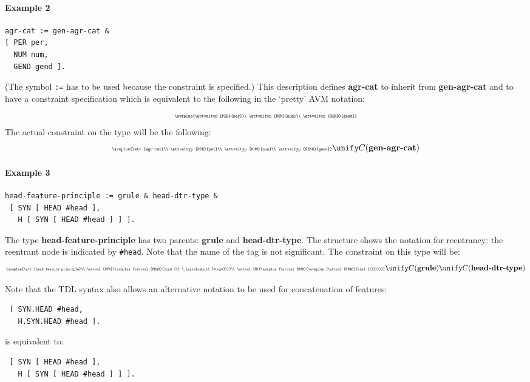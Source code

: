 \documentclass[12pt]{report}
\begin{document}
\paragraph{Example 2}

\begin{verbatim}
agr-cat := gen-agr-cat &
[ PER per,
  NUM num,
  GEND gend ].
\end{verbatim}
(The symbol \verb+:=+ has to be used because the
constraint is specified.)
This description
defines {\bf agr-cat} to inherit from {\bf gen-agr-cat} and to
have a constraint specification which is equivalent to the
following in the `pretty' AVM notation:
\[
\mbox{\tiny
   $\avmplus{\attvaltyp{PER}{per}\\
             \attvaltyp{NUM}{num}\\
             \attvaltyp{GEND}{gend}}$}
\]
The actual constraint on the type will be the following:
\[
\mbox{\tiny
   $\avmplus{\att{agr-cat}\\
             \attvaltyp{PER}{per}\\
             \attvaltyp{NUM}{num}\\
             \attvaltyp{GEND}{gend}}$} \unify
C(\mbox{\bf gen-agr-cat})
\]


\paragraph{Example 3}

\begin{verbatim}
head-feature-principle := grule & head-dtr-type & 
 [ SYN [ HEAD #head ],
   H [ SYN [ HEAD #head ] ] ].
\end{verbatim}
The type {\bf head-feature-principle}
has two parents: {\bf grule} and {\bf head-dtr-type}. 
The structure shows the notation for reentrancy: the
reentrant node is indicated by \verb+#head+.  Note that
the name of the tag is not significant.  
The constraint on this type will be:
\[
\mbox{\tiny
   $\avmplus{\att{head-feature-principle}\\
             \attval{SYN}{\avmplus
                           {\attval{HEAD}{\ind{1} \ \myvaluebold{*top*}}}}\\
             \attval{H}{\avmplus{\attval{SYN}{\avmplus
                                              {\attval{HEAD}{\ind{1}}}}}}}$}
\unify
C(\mbox{\bf  grule}) \unify
C(\mbox{\bf head-dtr-type})
\]

Note that the TDL syntax also allows an alternative notation to be used
for concatenation of features:
\begin{verbatim}
 [ SYN.HEAD #head,
   H.SYN.HEAD #head ].
\end{verbatim}
is equivalent to:
\begin{verbatim}
 [ SYN [ HEAD #head ],
   H [ SYN [ HEAD #head ] ] ].
\end{verbatim}
\end{document}
